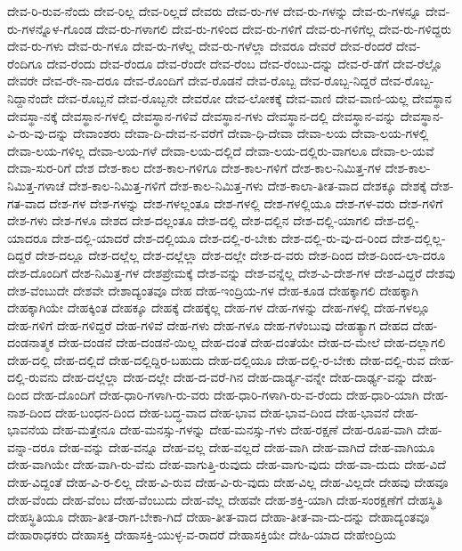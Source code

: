 {ದೇವ-ರಿ-ರುವ-ನೆಂದು
ದೇವ-ರಿಲ್ಲ
ದೇವ-ರಿಲ್ಲದೆ
ದೇವರು
ದೇವ-ರು-ಗಳ
ದೇವ-ರು-ಗಳನ್ನು
ದೇವ-ರು-ಗಳನ್ನೂ
ದೇವ-ರು-ಗಳನ್ನೊಳ-ಗೊಂಡ
ದೇವ-ರು-ಗಳಾಗಲಿ
ದೇವ-ರು-ಗಳಿಂದ
ದೇವ-ರು-ಗಳಿಗೆ
ದೇವ-ರು-ಗಳಿಗೆಲ್ಲ
ದೇವ-ರು-ಗಳಿದ್ದರು
ದೇವ-ರು-ಗಳು
ದೇವ-ರು-ಗಳೂ
ದೇವ-ರು-ಗಳೆಲ್ಲ
ದೇವ-ರು-ಗಳೆಲ್ಲಾ
ದೇವರೂ
ದೇವರೆ
ದೇವ-ರೆಂದರೆ
ದೇವ-ರೆಂದಿಗೂ
ದೇವ-ರೆಂದು
ದೇವ-ರೆಂದೂ
ದೇವ-ರೆಂದೇ
ದೇವ-ರೆಂಬ
ದೇವ-ರೆಂಬು-ದನ್ನು
ದೇವ-ರೆ-ಡೆಗೆ
ದೇವ-ರೆಲ್ಲೊ
ದೇವರೇ
ದೇವ-ರೇ-ನಾ-ದರೂ
ದೇವ-ರೊಂದಿಗೆ
ದೇವ-ರೊಡನೆ
ದೇವ-ರೊಬ್ಬ
ದೇವ-ರೊಬ್ಬ-ನಿದ್ದರೆ
ದೇವ-ರೊಬ್ಬ-ನಿದ್ದಾನೆಂದೇ
ದೇವ-ರೊಬ್ಬನೆ
ದೇವ-ರೊಬ್ಬನೇ
ದೇವರೋ
ದೇವ-ಲೋಕಕ್ಕೆ
ದೇವ-ವಾಣಿ
ದೇವ-ವಾಣಿ-ಯಲ್ಲ
ದೇವಸ್ಥಾನ
ದೇವಸ್ಥಾ-ನಕ್ಕೆ
ದೇವಸ್ಥಾನ-ಗಳಲ್ಲಿ
ದೇವಸ್ಥಾನ-ಗಳಿವೆ
ದೇವಸ್ಥಾನ-ಗಳು
ದೇವಸ್ಥಾನ-ದಲ್ಲಿ
ದೇವಸ್ಥಾನ-ವನ್ನು
ದೇವಸ್ಥಾನ-ವಿ-ರು-ವು-ದನ್ನು
ದೇವಾಂಶರು
ದೇವಾ-ದಿ-ದೇವ-ನ-ವರೆಗೆ
ದೇವಾ-ಧಿ-ದೇವಾ
ದೇವಾ-ಲಯ
ದೇವಾ-ಲಯ-ಗಳಲ್ಲಿ
ದೇವಾ-ಲಯ-ಗಳಿಲ್ಲ
ದೇವಾ-ಲಯ-ಗಳೆ
ದೇವಾ-ಲಯ-ದಲ್ಲಿದೆ
ದೇವಾ-ಲಯ-ದಲ್ಲಿರು-ವಾಗಲೂ
ದೇವಾ-ಲ-ಯವೆ
ದೇವಾ-ಸುರ-ರಿಗೆ
ದೇಶ
ದೇಶ-ಕಾಲ
ದೇಶ-ಕಾಲ-ಗಳಿಗೂ
ದೇಶ-ಕಾಲ-ಗಳಿಗೆ
ದೇಶ-ಕಾಲ-ನಿಮಿತ್ತ-ಗಳ
ದೇಶ-ಕಾಲ-ನಿಮಿತ್ತ-ಗಳಾಚೆ
ದೇಶ-ಕಾಲ-ನಿಮಿತ್ತ-ಗಳಿಗೆ
ದೇಶ-ಕಾಲ-ನಿಮಿತ್ತ-ಗಳು
ದೇಶ-ಕಾಲಾ-ತೀತ-ವಾದ
ದೇಶಕ್ಕೂ
ದೇಶಕ್ಕೆ
ದೇಶ-ಗತ-ವಾದ
ದೇಶ-ಗಳ
ದೇಶ-ಗಳನ್ನು
ದೇಶ-ಗಳಲ್ಲಂತೂ
ದೇಶ-ಗಳಲ್ಲಿ
ದೇಶ-ಗಳಲ್ಲಿಯೂ
ದೇಶ-ಗಳ-ವರು
ದೇಶ-ಗಳಿಗೆ
ದೇಶ-ಗಳು
ದೇಶ-ಗಳೂ
ದೇಶದ
ದೇಶ-ದಲ್ಲಂತೂ
ದೇಶ-ದಲ್ಲಿ
ದೇಶ-ದಲ್ಲಿನ
ದೇಶ-ದಲ್ಲಿ-ಯಾಗಲಿ
ದೇಶ-ದಲ್ಲಿ-ಯಾದರೂ
ದೇಶ-ದಲ್ಲಿ-ಯಾದರೆ
ದೇಶ-ದಲ್ಲಿಯೂ
ದೇಶ-ದಲ್ಲಿ-ರ-ಬೇಕು
ದೇಶ-ದಲ್ಲಿ-ರು-ವು-ದ-ರಿಂದ
ದೇಶ-ದಲ್ಲಿಲ್ಲ-ದಿದ್ದರೆ
ದೇಶ-ದಲ್ಲೂ
ದೇಶ-ದಲ್ಲೆಲ್ಲ
ದೇಶ-ದಲ್ಲೆಲ್ಲಾ
ದೇಶ-ದಲ್ಲೇ
ದೇಶ-ದ-ವರು
ದೇಶ-ದಿಂದ
ದೇಶ-ದಿಂದ-ಲಾ-ದರೂ
ದೇಶ-ದೊಂದಿಗೆ
ದೇಶ-ನಿಮಿತ್ತ-ಗಳ
ದೇಶಪ್ರೇಮಕ್ಕೆ
ದೇಶ-ವನ್ನು
ದೇಶ-ವನ್ನೆಲ್ಲ
ದೇಶ-ವಿ-ದೇಶ-ಗಳ
ದೇಶ-ವಿದ್ದರೆ
ದೇಶವು
ದೇಶ-ವೆಂಬುದೇ
ದೇಶವೇ
ದೇಶಾದ್ಯಂತವೂ
ದೇಹ
ದೇಹ-ಇಂದ್ರಿಯ-ಗಳ
ದೇಹ-ಕೂಡ
ದೇಹಕ್ಕಾಗಲಿ
ದೇಹಕ್ಕಾಗಿ
ದೇಹಕ್ಕಾಗಿಯೇ
ದೇಹಕ್ಕಿಂತ
ದೇಹಕ್ಕೂ
ದೇಹಕ್ಕೆ
ದೇಹಕ್ಕೆಲ್ಲ
ದೇಹ-ಗಳ
ದೇಹ-ಗಳನ್ನು
ದೇಹ-ಗಳಲ್ಲಿ
ದೇಹ-ಗಳಲ್ಲೂ
ದೇಹ-ಗಳಿಗೆ
ದೇಹ-ಗಳಿದ್ದರೆ
ದೇಹ-ಗಳಿವೆ
ದೇಹ-ಗಳು
ದೇಹ-ಗಳೂ
ದೇಹ-ಗಳೆಂಬುವು
ದೇಹತ್ಯಾಗ
ದೇಹದ
ದೇಹ-ದಂಡನಾತ್ಮಕ
ದೇಹ-ದಂಡನೆ
ದೇಹ-ದಂಡನೆ-ಯಿಲ್ಲ
ದೇಹ-ದಂತೆ
ದೇಹ-ದಂತೆಯೇ
ದೇಹ-ದ-ಮೇಲೆ
ದೇಹ-ದಲ್ಲಾಗಲಿ
ದೇಹ-ದಲ್ಲಿ
ದೇಹ-ದಲ್ಲಿದೆ
ದೇಹ-ದಲ್ಲಿದ್ದಿರ-ಬಹುದು
ದೇಹ-ದಲ್ಲಿಯೂ
ದೇಹ-ದಲ್ಲಿ-ರ-ಬೇಕು
ದೇಹ-ದಲ್ಲಿ-ರುವ
ದೇಹ-ದಲ್ಲಿ-ರುವನು
ದೇಹ-ದಲ್ಲೆಲ್ಲಾ
ದೇಹ-ದಲ್ಲೇ
ದೇಹ-ದ-ವರೆ-ಗಿನ
ದೇಹ-ದಾರ್ಡ್ಯ-ವನ್ನೇ
ದೇಹ-ದಾರ್ಢ್ಯ-ವನ್ನು
ದೇಹ-ದಿಂದ
ದೇಹ-ದೊಂದಿಗೆ
ದೇಹ-ಧಾರಿ-ಗಳಾಗಿ-ರು-ವರು
ದೇಹ-ಧಾರಿ-ಗಳಾಗಿ-ರು-ವ-ರೆಂದು
ದೇಹ-ಧಾರಿ-ಯಾಗಿ
ದೇಹ-ನಾಶ-ದಿಂದ
ದೇಹ-ಬಂಧನ-ದಿಂದ
ದೇಹ-ಬದ್ಧ-ವಾದ
ದೇಹ-ಭಾವ
ದೇಹ-ಭಾವ-ದಿಂದ
ದೇಹ-ಭಾವನೆ
ದೇಹ-ಭಾವನೆಯ
ದೇಹ-ಮತ್ತೇನೂ
ದೇಹ-ಮನಸ್ಸು-ಗಳನ್ನು
ದೇಹ-ಮನಸ್ಸು-ಗಳು
ದೇಹ-ರಕ್ಷಣೆ
ದೇಹ-ರೂಪ-ವಾಗಿ
ದೇಹ-ವನ್ನಾ-ದರೂ
ದೇಹ-ವನ್ನು
ದೇಹ-ವನ್ನೂ
ದೇಹ-ವಲ್ಲ
ದೇಹ-ವಲ್ಲದೆ
ದೇಹ-ವಾಗಿ
ದೇಹ-ವಾಗಿದೆ
ದೇಹ-ವಾಗಿಯೂ
ದೇಹ-ವಾಗಿಯೇ
ದೇಹ-ವಾಗಿ-ರು-ವೆನು
ದೇಹ-ವಾಗುತ್ತಿ-ರುವುದು
ದೇಹ-ವಾಗು-ವುದು
ದೇಹ-ವಾ-ದುದು
ದೇಹ-ವಿದೆ
ದೇಹ-ವಿದ್ದಂತೆ
ದೇಹ-ವಿ-ರ-ಲಿಲ್ಲ
ದೇಹ-ವಿ-ರುವ
ದೇಹ-ವಿ-ರು-ವುದು
ದೇಹ-ವಿಲ್ಲ
ದೇಹ-ವಿಲ್ಲದೇ
ದೇಹವು
ದೇಹವೂ
ದೇಹ-ವೆಂದು
ದೇಹ-ವೆಂಬ
ದೇಹ-ವೆಂಬುದು
ದೇಹ-ವೆಲ್ಲ
ದೇಹವೇ
ದೇಹ-ಶಕ್ತಿ-ಯಾಗಿ
ದೇಹ-ಸಂರಕ್ಷಣೆಗೆ
ದೇಹಸ್ಥಿತಿ
ದೇಹಸ್ಥಿತಿಯೂ
ದೇಹಾ-ತೀತ-ರಾಗ-ಬೇಕಾ-ಗಿದೆ
ದೇಹಾ-ತೀತ-ವಾದ
ದೇಹಾ-ತೀತ-ವಾ-ದು-ದನ್ನು
ದೇಹಾದ್ಯಂತವೂ
ದೇಹಾರಾಧಕರು
ದೇಹಾಸಕ್ತಿ
ದೇಹಾಸಕ್ತಿ-ಯುಳ್ಳ-ವ-ರಾದರೆ
ದೇಹಾಸಕ್ತಿಯೇ
ದೇಹಿ-ಯಾದ
ದೇಹೇಂದ್ರಿಯ
}
